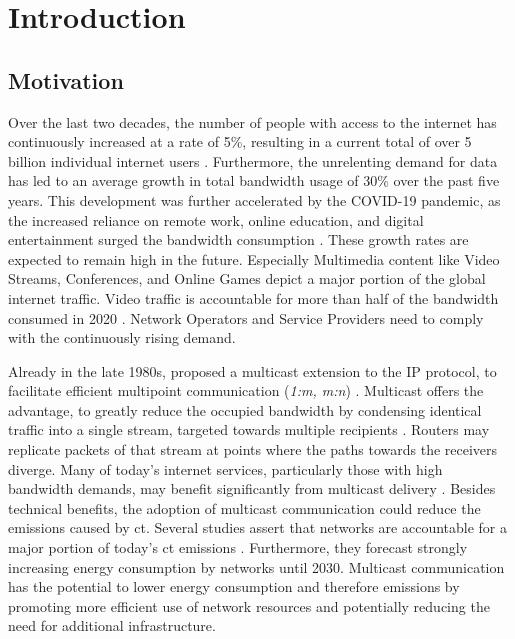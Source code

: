 \chapter{Introduction} %
\label{chap:Introduction}


\section{Motivation} %
\label{sec:Motivation}


Over the last two decades, the number of people with access to the internet has
    continuously increased at a rate of 5\%, resulting in a current total of
    over 5 billion individual internet users \cite{itu_digdev}.
Furthermore, the unrelenting demand for data has led to an average growth in
    total bandwidth usage of 30\% over the past five years.
This development was further accelerated by the COVID-19 pandemic, as the
    increased reliance on remote work, online education, and digital
    entertainment surged the bandwidth consumption \cite{cartesian_us_bw}.
These growth rates are expected to remain high in the future.
Especially Multimedia content like Video Streams, Conferences, and Online Games
    depict a major portion of the global internet traffic.
Video traffic is accountable for more than half of the bandwidth consumed in
    2020 \cite{cartesian_us_bw}.
Network Operators and Service Providers need to comply with the continuously
    rising demand.

Already in the late 1980s, \citeauthor{deering1990multicast} proposed a
    multicast extension to the IP protocol, to facilitate efficient multipoint
    communication (\textit{1:m, m:n})
    \cite{deering1990multicast, rfc1112_ip4mc}.
Multicast offers the advantage, to greatly reduce the occupied bandwidth by
    condensing identical traffic into a single stream, targeted towards
    multiple recipients \cite{rfc3376_igmp}.
Routers may replicate packets of that stream at points where the paths towards 
    the receivers diverge.
Many of today's internet services, particularly those with high bandwidth
    demands, may benefit significantly from multicast delivery
    \cite{ratnasamy2006revisiting, meadcast1}.
Besides technical benefits, the adoption of multicast communication could
    reduce the emissions caused by \gls{ct}.
Several studies assert that networks are accountable for a major portion of
    today's \gls{ct} emissions \cite{andrae2015global}.
Furthermore, they forecast strongly increasing energy consumption by networks
    until 2030.
Multicast communication has the potential to lower energy consumption and
    therefore emissions by promoting more efficient use of network resources
    and potentially reducing the need for additional infrastructure.



